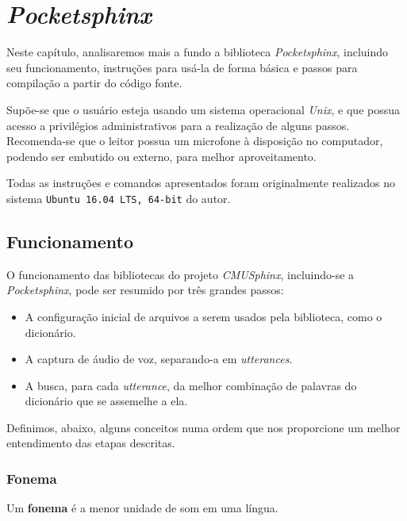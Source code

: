 \chapter{\textit{Pocketsphinx}}
\label{cap:pocketsphinx}

Neste capítulo, analisaremos mais a fundo a biblioteca \textit{Pocketsphinx}, incluindo seu funcionamento, instruções para usá-la de forma básica e passos para compilação a partir do código fonte.

Supõe-se que o usuário esteja usando um sistema operacional \textit{Unix}, e que possua acesso a privilégios administrativos para a realização de alguns passos. Recomenda-se que o leitor possua um microfone à disposição no computador, podendo ser embutido ou externo, para melhor aproveitamento.

Todas as instruções e comandos apresentados foram originalmente realizados no sistema \texttt{Ubuntu 16.04 LTS, 64-bit} do autor.


\section{Funcionamento}

O funcionamento das bibliotecas do projeto \textit{CMUSphinx}, incluindo-se a \textit{Pocketsphinx}, pode ser resumido por três grandes passos:

\begin{itemize}
\item A configuração inicial de arquivos a serem usados pela biblioteca, como o dicionário.
\item A captura de áudio de voz, separando-a em \textit{utterances}.
\item A busca, para cada \textit{utterance}, da melhor combinação de palavras do dicionário que se assemelhe a ela.
\end{itemize}

Definimos, abaixo, alguns conceitos numa ordem que nos proporcione um melhor entendimento das etapas descritas.


\subsection{Fonema}

Um \textbf{fonema} é a menor unidade de som em uma língua.

